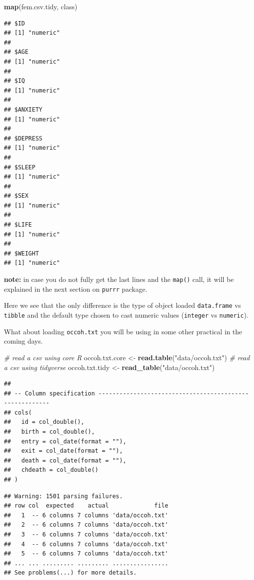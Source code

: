 \documentclass[
]{book}
\newenvironment{Shaded}{\begin{snugshade}}{\end{snugshade}}
\newcommand{\CommentTok}[1]{\textcolor[rgb]{0.56,0.35,0.01}{\textit{#1}}}
\newcommand{\FunctionTok}[1]{\textcolor[rgb]{0.13,0.29,0.53}{\textbf{#1}}}
\newcommand{\NormalTok}[1]{#1}
\newcommand{\OtherTok}[1]{\textcolor[rgb]{0.56,0.35,0.01}{#1}}
\newcommand{\StringTok}[1]{\textcolor[rgb]{0.31,0.60,0.02}{#1}}
\theoremstyle{definition}
\theoremstyle{definition}
\theoremstyle{definition}
\theoremstyle{definition}
\theoremstyle{remark}
\begin{document}
\begin{Shaded}
\begin{Highlighting}[]
\FunctionTok{map}\NormalTok{(fem.csv.tidy, class)}
\end{Highlighting}
\end{Shaded}

\begin{verbatim}
## $ID
## [1] "numeric"
## 
## $AGE
## [1] "numeric"
## 
## $IQ
## [1] "numeric"
## 
## $ANXIETY
## [1] "numeric"
## 
## $DEPRESS
## [1] "numeric"
## 
## $SLEEP
## [1] "numeric"
## 
## $SEX
## [1] "numeric"
## 
## $LIFE
## [1] "numeric"
## 
## $WEIGHT
## [1] "numeric"
\end{verbatim}

\textbf{note:} in case you do not fully get the last lines and the \texttt{map()} call, it will be explained in the next section on \texttt{purrr} package.

Here we see that the only difference is the type of object loaded \texttt{data.frame} vs \texttt{tibble} and the default type chosen to cast numeric values (\texttt{integer} vs \texttt{numeric}).

What about loading \texttt{occoh.txt} you will be using in some other practical in the coming days.

\begin{Shaded}
\begin{Highlighting}[]
\CommentTok{\# read a csv using core R}
\NormalTok{occoh.txt.core }\OtherTok{\textless{}{-}} \FunctionTok{read.table}\NormalTok{(}\StringTok{"data/occoh.txt"}\NormalTok{)}
\CommentTok{\# read a csv using tidyverse}
\NormalTok{occoh.txt.tidy }\OtherTok{\textless{}{-}} \FunctionTok{read\_table}\NormalTok{(}\StringTok{"data/occoh.txt"}\NormalTok{)}
\end{Highlighting}
\end{Shaded}

\begin{verbatim}
## 
## -- Column specification --------------------------------------------------------
## cols(
##   id = col_double(),
##   birth = col_double(),
##   entry = col_date(format = ""),
##   exit = col_date(format = ""),
##   death = col_date(format = ""),
##   chdeath = col_double()
## )
\end{verbatim}

\begin{verbatim}
## Warning: 1501 parsing failures.
## row col  expected    actual             file
##   1  -- 6 columns 7 columns 'data/occoh.txt'
##   2  -- 6 columns 7 columns 'data/occoh.txt'
##   3  -- 6 columns 7 columns 'data/occoh.txt'
##   4  -- 6 columns 7 columns 'data/occoh.txt'
##   5  -- 6 columns 7 columns 'data/occoh.txt'
## ... ... ......... ......... ................
## See problems(...) for more details.
\end{verbatim}
\end{document}
